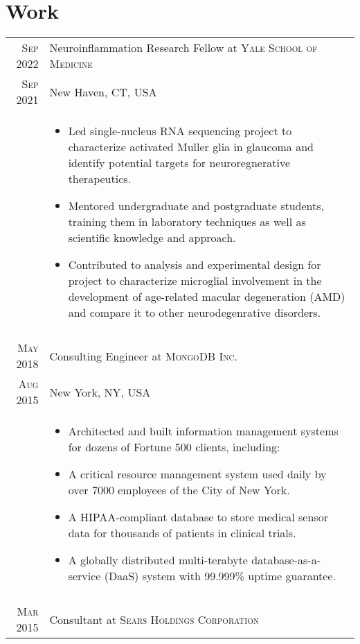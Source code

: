 \documentclass[a4paper,10pt]{article}
\begin{document}
\section{Work}
\begin{longtable}{r|p{11cm}}
 \nopagebreak \textsc{Sep 2022} & Neuroinflammation Research Fellow at \textsc{Yale School of Medicine}\\
 \nopagebreak \textsc{Sep 2021} & \small{New Haven, CT, USA} \\
 \nopagebreak & \footnotesize{
	\begin{itemize}
		\item[]{
			Led single-nucleus RNA sequencing project to characterize activated Muller glia in glaucoma and identify potential targets for neuroregnerative therapeutics.
		}
		\item[]{
			Mentored undergraduate and postgraduate students, training them in laboratory techniques as well as scientific knowledge and approach.
		}
		\item[]{
			Contributed to analysis and experimental design for project to characterize microglial involvement in the development of age-related macular degeneration (AMD) and compare it to other neurodegenrative disorders.
		}
	\end{itemize}
   }\\
 \multicolumn{2}{c}{} \\
 \nopagebreak \textsc{May 2018} & Consulting Engineer at \textsc{MongoDB Inc.}\\
 \nopagebreak \textsc{Aug 2015} & \small{New York, NY, USA} \\
 \nopagebreak & \footnotesize{
	\begin{itemize}
		\item[]{
			Architected and built information management systems for dozens of Fortune 500
			clients, including:
		}
		\item[]{
			A critical resource management system used daily by over 7000 employees of the City of New York.
		}
		\item[]{
			A HIPAA-compliant database to store medical sensor data for thousands of patients
in clinical trials.
		}
		\item[]{
			A globally distributed multi-terabyte database-as-a-service (DaaS) system with
99.999\% uptime guarantee.
		}
	\end{itemize}
   }\\
 \multicolumn{2}{c}{} \\
 \nopagebreak \textsc{Mar 2015} & Consultant at \textsc{Sears Holdings Corporation}\\

\end{longtable}
\end{document}
